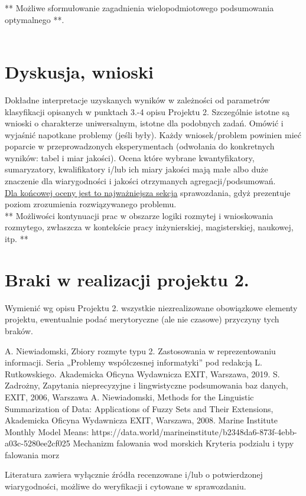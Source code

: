 \documentclass{article}
\begin{document}
** Możliwe sformułowanie zagadnienia wielopodmiotowego podsumowania optymalnego **.\\
\\



\section{Dyskusja, wnioski}
Dokładne interpretacje uzyskanych wyników w zależności od parametrów klasyfikacji
opisanych w punktach 3.-4 opisu Projektu 2. 
Szczególnie istotne są wnioski o charakterze uniwersalnym, istotne dla podobnych zadań. 
Omówić i wyjaśnić napotkane problemy (jeśli były). Każdy wniosek/problem powinien mieć poparcie
w przeprowadzonych eksperymentach (odwołania do konkretnych wyników: tabel i miar
jakości). Ocena które wybrane kwantyfikatory, sumaryzatory, kwalifikatory i/lub ich
miary jakości mają małe albo duże znaczenie dla wiarygodności i jakości otrzymanych
agregacji/podsumowań.  \\
\underline{Dla końcowej oceny jest to najważniejsza sekcja} sprawozdania, gdyż prezentuje poziom
zrozumienia rozwiązywanego problemu.\\

** Możliwości kontynuacji prac w obszarze logiki rozmytej i wnioskowania rozmytego, zwłaszcza w kontekście pracy inżynierskiej,
magisterskiej, naukowej, itp. **\\



\section{Braki w realizacji projektu 2.}
Wymienić wg opisu Projektu 2. wszystkie niezrealizowane obowiązkowe elementy projektu, ewentualnie
podać merytoryczne (ale nie czasowe) przyczyny tych braków. 


\begin{thebibliography}{99}
  A. Niewiadomski, Zbiory rozmyte typu 2. Zastosowania w reprezentowaniu informacji.  Seria „Problemy współczesnej informatyki” pod redakcją L. Rutkowskiego. Akademicka Oficyna Wydawnicza EXIT, Warszawa, 2019.
 S. Zadrożny, Zapytania nieprecyzyjne i lingwistyczne podsumowania baz danych, EXIT, 2006, Warszawa
 A. Niewiadomski, Methods for the Linguistic Summarization of Data: Applications of Fuzzy Sets and Their Extensions, Akademicka Oficyna Wydawnicza EXIT, Warszawa, 2008.
 Marine Institute Monthly Model Means: https://data.world/marineinstitute/b2348da6-873f-4ebb-a03c-5280ee2cf025
 Mechanizm falowania wod morskich Kryteria podzialu i typy falowania morz
\end{thebibliography}

Literatura zawiera wyłącznie źródła recenzowane i/lub o potwierdzonej wiarygodności,
możliwe do weryfikacji i cytowane w sprawozdaniu. 
\end{document}
